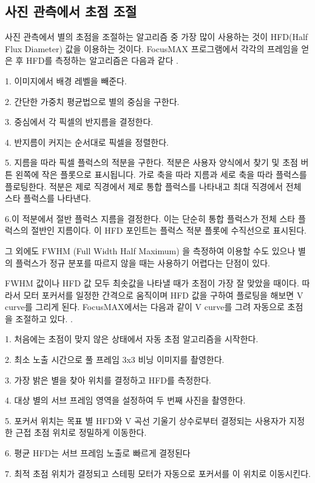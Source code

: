 \subsection{사진 관측에서 초점 조절}

사진 관측에서 별의 초점을 조절하는 알고리즘 중 가장 많이 사용하는 것이 HFD(Half Flux Diameter) 값을 이용하는 것이다. FocusMAX 프로그램에서 각각의 프레임을 얻은 후 HFD를 측정하는 알고리즘은 다음과 같다 \cite{weber2001fast}.

1. 이미지에서 배경 레벨을 빼준다. 

2. 간단한 가중치 평균법으로 별의 중심을 구한다.

3. 중심에서 각 픽셀의 반지름을 결정한다. 

4. 반지름이 커지는 순서대로 픽셀을 정렬한다. 

5. 지름을 따라 픽셀 플럭스의 적분을 구한다. 적분은 사용자 양식에서 찾기 및 초점 버튼 왼쪽에 작은 플롯으로 표시됩니다. 가로 축을 따라 지름과 세로 축을 따라 플럭스를 플로팅한다. 적분은 제로 직경에서 제로 통합 플럭스를 나타내고 최대 직경에서 전체 스타 플럭스를 나타낸다. 

6.이 적분에서 절반 플럭스 지름을 결정한다. 이는 단순히 통합 플럭스가 전체 스타 플럭스의 절반인 지름이다. 이 HFD 포인트는 플럭스 적분 플롯에 수직선으로 표시된다. 

그 외에도 FWHM (Full Width Half Maximum) 을 측정하여 이용할 수도 있으나 별의 플럭스가 정규 분포를 따르지 않을 때는 사용하기 어렵다는 단점이 있다. 

FWHM 값이나 HFD 값 모두 최솟값을 나타낼 때가 초점이 가장 잘 맞았을 때이다. 따라서 모터 포커서를 일정한 간격으로 움직이며 HFD 값을 구하여 플로팅을 해보면 V curve를 그리게 된다. FocusMAX에서는 다음과 같이  V curve를 그려 자동으로 초점을 조절하고 있다. \cite{weber2001fast}.

1. 처음에는 초점이 맞지 않은 상태에서 자동 초점 알고리즘을 시작한다. 

2. 최소 노출 시간으로 풀 프레임 3x3 비닝 이미지를 촬영한다. 

3. 가장 밝은 별을 찾아 위치를 결정하고 HFD를 측정한다. 

4. 대상 별의 서브 프레임 영역을 설정하여 두 번째 사진을 촬영한다. 

5. 포커서 위치는 목표 별 HFD와 V 곡선 기울기 상수로부터 결정되는 사용자가 지정한 근접 초점 위치로 정밀하게 이동한다. 

6. 평균 HFD는 서브 프레임 노출로 빠르게 결정된다

7. 최적 초점 위치가 결정되고 스테핑 모터가 자동으로 포커서를 이 위치로 이동시킨다. 

